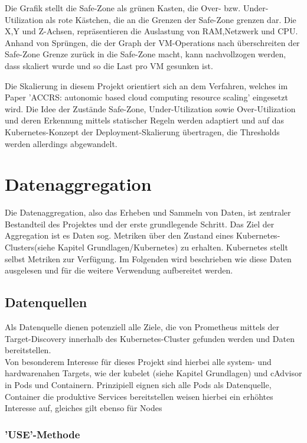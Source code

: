 \documentclass[a4paper,10pt]{scrartcl}
\begin{document}
Die Grafik stellt die Safe-Zone als grünen Kasten, die Over- bzw. Under-Utilization als rote Kästchen, die an die Grenzen der Safe-Zone grenzen dar. Die X,Y und Z-Achsen, repräsentieren die Auslastung von RAM,Netzwerk und CPU. Anhand von Sprüngen, die der Graph der VM-Operations nach überschreiten der Safe-Zone Grenze zurück in die Safe-Zone macht, kann nachvollzogen werden, dass skaliert wurde und so die Last pro VM gesunken ist.

Die Skalierung in diesem Projekt orientiert sich an dem Verfahren, welches im Paper 'ACCRS: autonomic based cloud computing resource scaling' eingesetzt wird. Die Idee der Zustände Safe-Zone, Under-Utilization sowie Over-Utilization und deren Erkennung mittels statischer Regeln werden adaptiert und auf das Kubernetes-Konzept der Deployment-Skalierung übertragen, die Thresholds werden allerdings abgewandelt. 


\pagebreak
\section{Datenaggregation}

Die Datenaggregation, also das Erheben und Sammeln von Daten, ist zentraler Bestandteil des Projektes und der erste grundlegende Schritt. Das Ziel der Aggregation ist es Daten sog. Metriken über den Zustand eines Kubernetes-Clusters(siehe Kapitel Grundlagen/Kubernetes) zu erhalten. Kubernetes stellt selbst Metriken zur Verfügung. Im Folgenden wird beschrieben wie diese Daten ausgelesen und für die weitere Verwendung aufbereitet werden.

\subsection{Datenquellen}

Als Datenquelle dienen potenziell alle Ziele, die von Prometheus mittels der Target-Discovery innerhalb des Kubernetes-Cluster gefunden werden und Daten bereitstellen.\\
Von besonderem Interesse für dieses Projekt sind hierbei alle system- und hardwarenahen Targets, wie der kubelet (siehe Kapitel Grundlagen) und cAdvisor in Pods und Containern.
Prinzipiell eignen sich alle Pods als Datenquelle, Container die produktive Services bereitstellen weisen hierbei ein erhöhtes Interesse auf, gleiches gilt ebenso für Nodes

\subsubsection{'USE'-Methode}
\end{document}
